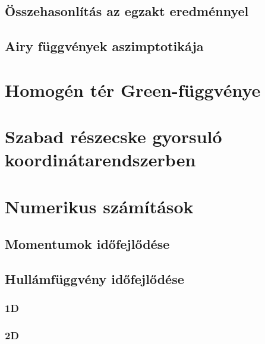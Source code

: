 \documentclass[pdftex,12pt,a4paper]{article}
\DeclareMathOperator{\Ai}{Ai}
\DeclareMathOperator{\Ti}{Ti}
\begin{document}
	\subsection{Összehasonlítás az egzakt eredménnyel}
		
	\subsection{Airy függvények aszimptotikája}
		
\section{Homogén tér Green-függvénye}
	
\appendix
\section{Szabad részecske gyorsuló koordinátarendszerben}
	
\section{Numerikus számítások}
	\subsection{Momentumok időfejlődése}
		
	\subsection{Hullámfüggvény időfejlődése}
		\subsubsection{1D}
		\subsubsection{2D}

	
    \newpage
	
    
\end{document}

